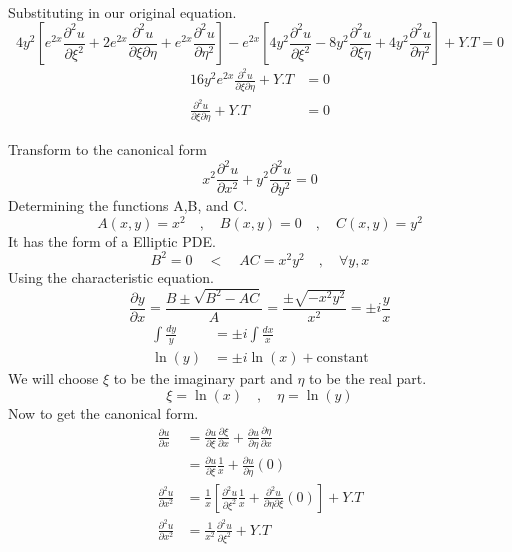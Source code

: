 \documentclass[]{article}
\begin{document}
\begin{example}
\begin{align*}
    \end{align*}
    Substituting in our original equation.
    \[
        4y^2\left[e^{2x}\frac{\partial^2 u}{\partial\xi^2}+2e^{2x}\frac{\partial^2 u}{\partial\xi\partial\eta}+e^{2x}\frac{\partial^2 u}{\partial\eta^2}\right]-e^{2x}\left[4y^2\frac{\partial^2 u}{\partial\xi^2}-8y^2\frac{\partial^2 u}{\partial\xi\eta}+4y^2\frac{\partial^2 u}{\partial\eta^2}\right]+Y.T = 0    
    \]
    \begin{align*}
        16y^2 e^{2x}\frac{\partial^2 u}{\partial\xi\partial\eta}+Y.T &= 0
        \\
        \frac{\partial^2 u}{\partial\xi\partial\eta} +Y.T &= 0
    \end{align*}
\end{example}
\begin{example}
    Transform to the canonical form
    \[
        x^2\frac{\partial^2 u}{\partial x^2}+y^2\frac{\partial^2 u}{\partial y^2} = 0  
    \]
    Determining the functions A,B, and C.
    \[
        A\left(x,y\right)=x^2 \quad,\quad B\left(x,y\right)=0 \quad,\quad C\left(x,y\right)=y^2    
    \]
    It has the form of a Elliptic PDE.
    \[
        B^2 =0 \quad<\quad AC=x^2 y^{2} \quad,\quad \forall y, x  
    \]
    Using the characteristic equation.
    \[
        \frac{\partial y}{\partial x} = \frac{B\pm\sqrt{B^2 -AC}}{A} = \frac{\pm\sqrt{-x^2 y^2}}{x^2}=\pm i\frac{y}{x}    
    \]
    \begin{align*}
        \int\frac{dy}{y} &= \pm i\int\frac{dx}{x}
        \\
        \ln\left(y\right) &= \pm i \ln\left(x\right)+\text{constant}
    \end{align*}
    We will choose $\xi$ to be the imaginary part and $\eta$ to be the real part.
    \[
        \xi = \ln\left(x\right) \quad , \quad \eta = \ln\left(y\right)    
    \]
    Now to get the canonical form.
    \begin{align*}
        \frac{\partial u}{\partial x} &= \frac{\partial u}{\partial\xi}\frac{\partial\xi}{\partial x} + \frac{\partial u }{\partial\eta}\frac{\partial\eta}{\partial x}
        \\
        &= \frac{\partial u}{\partial\xi}\frac{1}{x}+\frac{\partial u}{\partial\eta}\left(0\right)
        \\
        \frac{\partial^2 u}{\partial x^2} &= \frac{1}{x}\left[\frac{\partial^2 u}{\partial\xi^2}\frac{1}{x}+\frac{\partial^2 u}{\partial\eta\partial\xi}\left(0\right)\right] + Y.T
        \\
        \frac{\partial^2 u}{\partial x^2} &=\frac{1}{x^2}\frac{\partial^2 u}{\partial\xi^2}+Y.T

\end{align*}
\end{example}
\end{document}
